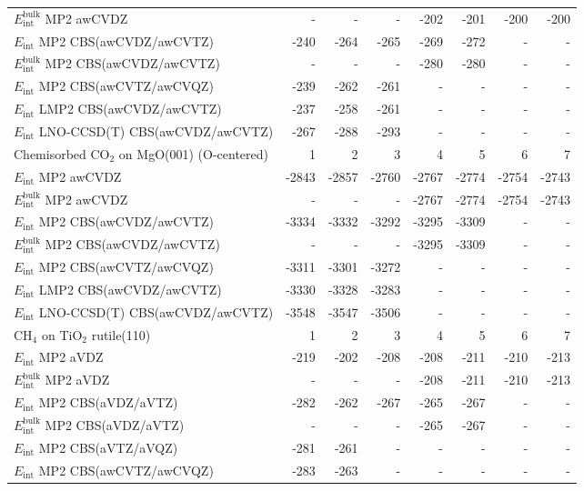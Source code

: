 \begin{longtable}{lrrrrrrr}
$E_\textrm{int}^\textrm{bulk}$ MP2 awCVDZ & - & - & - & -202 & -201 & -200 & -200 \\
$E_\textrm{int}$ MP2 CBS(awCVDZ/awCVTZ) & -240 & -264 & -265 & -269 & -272 & - & - \\
$E_\textrm{int}^\textrm{bulk}$ MP2 CBS(awCVDZ/awCVTZ) & - & - & - & -280 & -280 & - & - \\
$E_\textrm{int}$ MP2 CBS(awCVTZ/awCVQZ) & -239 & -262 & -261 & - & - & - & - \\
$E_\textrm{int}$ LMP2 CBS(awCVDZ/awCVTZ) & -237 & -258 & -261 & - & - & - & - \\
$E_\textrm{int}$ LNO-CCSD(T) CBS(awCVDZ/awCVTZ) & -267 & -288 & -293 & - & - & - & - \\
\toprule
Chemisorbed CO$_2$ on MgO(001) (O-centered) & 1 & 2 & 3 & 4 & 5 & 6 & 7 \\ 
\midrule
$E_\textrm{int}$ MP2 awCVDZ & -2843 & -2857 & -2760 & -2767 & -2774 & -2754 & -2743 \\
$E_\textrm{int}^\textrm{bulk}$ MP2 awCVDZ & - & - & - & -2767 & -2774 & -2754 & -2743 \\
$E_\textrm{int}$ MP2 CBS(awCVDZ/awCVTZ) & -3334 & -3332 & -3292 & -3295 & -3309 & - & - \\
$E_\textrm{int}^\textrm{bulk}$ MP2 CBS(awCVDZ/awCVTZ) & - & - & - & -3295 & -3309 & - & - \\
$E_\textrm{int}$ MP2 CBS(awCVTZ/awCVQZ) & -3311 & -3301 & -3272 & - & - & - & - \\
$E_\textrm{int}$ LMP2 CBS(awCVDZ/awCVTZ) & -3330 & -3328 & -3283 & - & - & - & - \\
$E_\textrm{int}$ LNO-CCSD(T) CBS(awCVDZ/awCVTZ) & -3548 & -3547 & -3506 & - & - & - & - \\
\toprule
CH$_4$ on TiO$_2$ rutile(110) & 1 & 2 & 3 & 4 & 5 & 6 & 7 \\ 
\midrule
$E_\textrm{int}$ MP2 aVDZ & -219 & -202 & -208 & -208 & -211 & -210 & -213 \\
$E_\textrm{int}^\textrm{bulk}$ MP2 aVDZ & - & - & - & -208 & -211 & -210 & -213 \\
$E_\textrm{int}$ MP2 CBS(aVDZ/aVTZ) & -282 & -262 & -267 & -265 & -267 & - & - \\
$E_\textrm{int}^\textrm{bulk}$ MP2 CBS(aVDZ/aVTZ) & - & - & - & -265 & -267 & - & - \\
$E_\textrm{int}$ MP2 CBS(aVTZ/aVQZ) & -281 & -261 & - & - & - & - & - \\
$E_\textrm{int}$ MP2 CBS(awCVTZ/awCVQZ) & -283 & -263 & - & - & - & - & - \\

\end{longtable}
